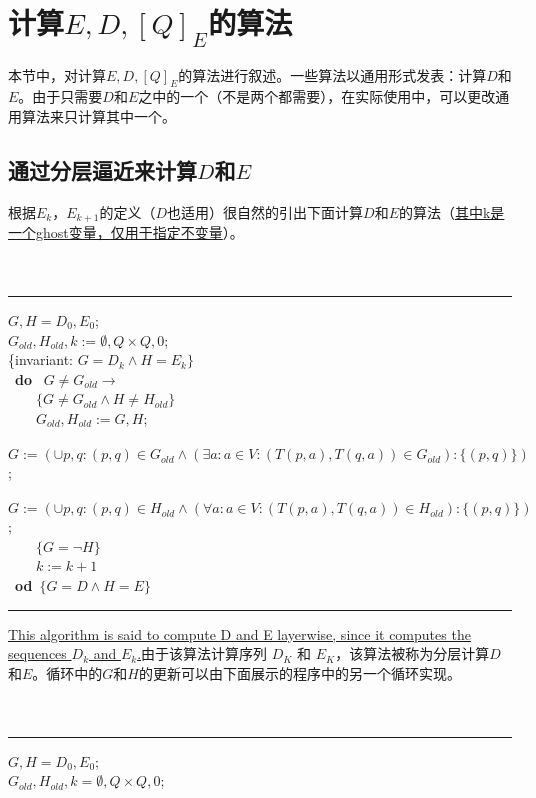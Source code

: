 
\chapter{计算$E,D,[Q]_E$的算法}
本节中，对计算$E,D,[Q]_E$的算法进行叙述。一些算法以通用形式发表：计算$D$和$E$。由于只需要$D$和$E$之中的一个（不是两个都需要），在实际使用中，可以更改通用算法来只计算其中一个。

\section{通过分层逼近来计算$D$和$E$}

根据$E_k$，$E_{k+1}$的定义（$D$也适用）很自然的引出下面计算$D$和$E$的算法（\uline{其中k是一个ghost变量，仅用于指定不变量}）。
\\
\\
\\
\rule{\textwidth}{1pt}
\mbox{}$G,H=D_0,E_0$;\\
\mbox{}$G_{old},H_{old},k:=\emptyset ,Q \times Q,0$;\\
\mbox{\{invariant:} $G=D_k \land H =E_k \}$\\
\mbox{ \textbf{do} } $G \not= G_{old} \longrightarrow$ \\
\mbox{　　}$\{G \not= G_{old} \land H \not= H_{old} \}$ \\
\mbox{　　}$G_{old},H_{old}:=G,H$;\\
\mbox{　　}$G:=(\cup  p,q:(p,q)\in G_{old}\land (\exists  a:a \in V : (T(p,a),T(q,a))\in G_{old} ) : \{(p,q)\})$; \\
\mbox{　　}$G:=(\cup  p,q:(p,q)\in H_{old}\land (\forall  a:a \in V : (T(p,a),T(q,a))\in H_{old} ) : \{(p,q)\})$; \\
\mbox{　　}$\{G=\neg H\}$ \\
\mbox{　　}$k:=k+1$ \\
\mbox{ \textbf{od} }$ \{ G=D \land H=E \}$ \\
\rule{\textwidth}{1pt}
\uline{This algorithm is said to compute D and E layerwise, since it computes the sequences $D_k$ and $E_k$.}由于该算法计算序列 $D_K$ 和 $E_K$，该算法被称为分层计算$D$和$E$。循环中的$G$和$H$的更新可以由下面展示的程序中的另一个循环实现。
\\
\\
\\
\rule{\textwidth}{1pt}
\mbox{}$G,H=D_0,E_0$;\\
\mbox{}$G_{old},H_{old},k=\emptyset ,Q \times Q,0$;\\
